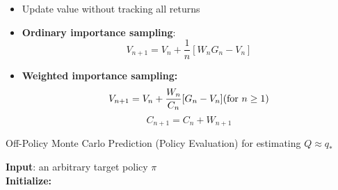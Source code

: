 \begin{itemize}
    \item Update value without tracking all returns
    
    \item \textbf{Ordinary importance sampling}:
    \[
        V_{n+1} = V_n + \displaystyle\frac{1}{n}[W_nG_n - V_n]
    \]

    \item \textbf{Weighted importance sampling:}
    \[
        V_{n+1} = V_n + \displaystyle\frac{W_n}{C_n}[G_n - V_n] \hfill \text{(for $n\geq 1$)}
    \]
    \[
        C_{n+1} = C_n + W_{n+1}
    \]
\end{itemize}

\begin{algorithm}[h!]
    \caption{Off-Policy Monte Carlo Prediction (Policy Evaluation) for estimating $Q \approx q_*$}

    \textbf{Input}: an arbitrary target policy $\pi$\\

    \textbf{Initialize:}\\

\end{algorithm}



